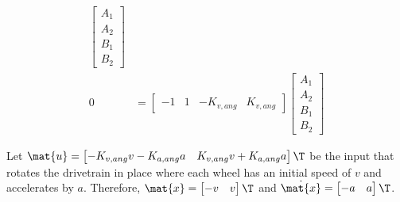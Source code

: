 \begin{align*}
\begin{bmatrix}
      A_1 \\
      A_2 \\
      B_1 \\
      B_2
    \end{bmatrix} \\
  0 &=
    \begin{bmatrix}
      -1 & 1 & -K_{v,ang} & K_{v,ang}
    \end{bmatrix}
    \begin{bmatrix}
      A_1 \\
      A_2 \\
      B_1 \\
      B_2
    \end{bmatrix}
\end{align*}

Let $\mat{u} =
\begin{bmatrix}
  -K_{v,ang} v - K_{a,ang} a & K_{v,ang} v + K_{a,ang} a
\end{bmatrix}\T$ be the input that rotates the drivetrain in place where each
wheel has an initial speed of $v$ and accelerates by $a$. Therefore, $\mat{x} =
\begin{bmatrix}
  -v & v
\end{bmatrix}\T$ and $\dot{\mat{x}} =
\begin{bmatrix}
  -a & a
\end{bmatrix}\T$.
